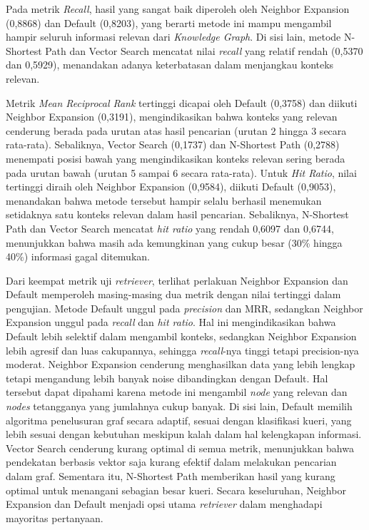 Pada metrik \textit{Recall}, hasil yang sangat baik diperoleh oleh Neighbor Expansion (0,8868) dan Default (0,8203), yang berarti metode ini mampu mengambil hampir seluruh informasi relevan dari \textit{Knowledge Graph}.
Di sisi lain, metode N-Shortest Path dan Vector Search mencatat nilai \textit{recall} yang relatif rendah (0,5370 dan 0,5929), menandakan adanya keterbatasan dalam menjangkau konteks relevan.


Metrik \textit{Mean Reciprocal Rank} tertinggi dicapai oleh Default (0,3758) dan diikuti Neighbor Expansion (0,3191), mengindikasikan bahwa konteks yang relevan cenderung berada pada urutan atas hasil pencarian (urutan 2 hingga 3 secara rata-rata).
Sebaliknya, Vector Search (0,1737) dan N-Shortest Path (0,2788) menempati posisi bawah  yang mengindikasikan konteks relevan sering berada pada urutan bawah (urutan 5 sampai 6 secara rata-rata).
Untuk \textit{Hit Ratio}, nilai tertinggi diraih oleh Neighbor Expansion (0,9584), diikuti Default (0,9053), menandakan bahwa metode tersebut hampir selalu berhasil menemukan setidaknya satu konteks relevan dalam hasil pencarian.
Sebaliknya, N-Shortest Path dan Vector Search mencatat \textit{hit ratio} yang rendah 0,6097 dan 0,6744, menunjukkan bahwa masih ada kemungkinan yang cukup besar (30\% hingga 40\%) informasi gagal ditemukan.

Dari keempat metrik uji \textit{retriever}, terlihat perlakuan Neighbor Expansion dan Default memperoleh masing-masing dua metrik dengan nilai tertinggi dalam pengujian.
Metode Default unggul pada \textit{precision} dan MRR, sedangkan Neighbor Expansion unggul pada \textit{recall} dan \textit{hit ratio}.
Hal ini mengindikasikan bahwa Default lebih selektif dalam mengambil konteks, sedangkan Neighbor Expansion lebih agresif dan luas cakupannya, sehingga \textit{recall}-nya tinggi tetapi precision-nya moderat.
Neighbor Expansion cenderung menghasilkan data yang lebih lengkap tetapi mengandung lebih banyak noise dibandingkan dengan Default.
Hal tersebut dapat dipahami karena metode ini mengambil \textit{node} yang relevan dan \textit{nodes} tetangganya yang jumlahnya cukup banyak.
Di sisi lain, Default memilih algoritma penelusuran graf secara adaptif, sesuai dengan klasifikasi kueri, yang lebih sesuai dengan kebutuhan meskipun kalah dalam hal kelengkapan informasi.
Vector Search cenderung kurang optimal di semua metrik, menunjukkan bahwa pendekatan berbasis vektor saja kurang efektif dalam melakukan pencarian dalam graf.
Sementara itu, N-Shortest Path memberikan hasil yang kurang optimal untuk menangani sebagian besar kueri.
Secara keseluruhan, Neighbor Expansion dan Default menjadi opsi utama \textit{retriever} dalam menghadapi mayoritas pertanyaan.


